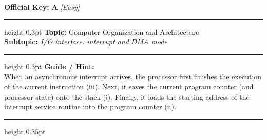 \documentclass[a4paper,10pt]{article}
\begin{document}
\begin{tcolorbox}
\textbf{Official Key:} \textbf{\large A} \hfill \textit{\small [Easy]}
\vspace{2pt}\hrule height 0.3pt\vspace{3pt}
\textbf{Topic:} Computer Organization and Architecture \\
\textbf{Subtopic:} \textit{I/O interface: interrupt and DMA mode}
\vspace{2pt}\hrule height 0.3pt\vspace{3pt}
\textbf{Guide / Hint:} \\
{\small When an asynchronous interrupt arrives, the processor first finishes the execution of the current instruction (iii). Next, it saves the current program counter (and processor state) onto the stack (i). Finally, it loads the starting address of the interrupt service routine into the program counter (ii).}

\end{tcolorbox}
\vspace{6pt}\hrule height 0.35pt\vspace{6pt}
\noindent
\end{document}
